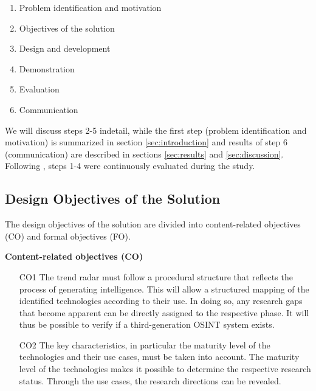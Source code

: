 \documentclass[10pt]{article}
\begin{document}
\begin{enumerate}
    \item Problem identification and motivation
    \item Objectives of the solution
    \item Design and development
    \item Demonstration
    \item Evaluation
    \item Communication
\end{enumerate}

We will discuss steps 2-5 indetail, while the first step (problem identification and motivation) is summarized in section \ref{sec:introduction} and results of step 6 (communication) are described in sections \ref{sec:results} and \ref{sec:discussion}. Following \cite{Sonnenberg.2012}, steps 1-4 were continuously evaluated during the study.


\subsection{Design Objectives of the Solution}

The design objectives of the solution are divided into content-related objectives (CO) and formal objectives (FO).

\textbf{Content-related objectives (CO)}
\begin{itemize}
    \item[CO1] The trend radar must follow a procedural structure that reflects the process of generating intelligence. This will allow a structured mapping of the identified technologies according to their use. In doing so, any research gaps that become apparent can be directly assigned to the respective phase. It will thus be possible to verify if a third-generation OSINT system exists.
    \item[CO2] The key characteristics, in particular the maturity level of the technologies and their use cases, must be taken into account. The maturity level of the technologies makes it possible to determine the respective research status. Through the use cases, the research directions can be revealed.
\end{itemize}
\end{document}
